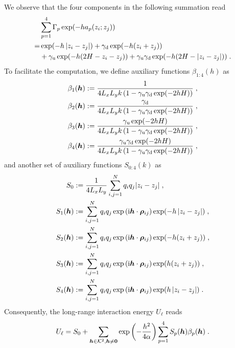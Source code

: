 We observe that the four components in the following summation read
\begin{align*}
     &\sum_{p=1}^4\Gamma_p\exp(-ha_p(z_i;z_j))\\  
     =&\exp(- h \left\lvert z_i-z_j\right\rvert)+\gamma_{\mathrm{d}}\exp(-h(z_i+z_j))\\
     &+\gamma_{\mathrm{u}}\exp(-h(2H-z_i-z_j)) +\gamma_{\mathrm{u}}\gamma_{\mathrm{d}}\exp(-h(2H-\left\lvert z_i-z_j\right\rvert))\;.
\end{align*}
To facilitate the computation, we define auxiliary functions $\beta_{1:4}(h)$ as 
\begin{align*}
    \beta_1(\boldsymbol{h})&:= \frac{1}{4  L_xL_yk\left(1-\gamma_{\mathrm{u}}\gamma_{\mathrm{d}}\exp(-2hH)\right)} \;,\\
    \beta_2(\boldsymbol{h})&:= \frac{\gamma_{\mathrm{d}}}{4  L_xL_yk\left(1-\gamma_{\mathrm{u}}\gamma_{\mathrm{d}}\exp(-2hH)\right)} \;,\\
    \beta_3(\boldsymbol{h})&:= \frac{\gamma_{\mathrm{u}}\exp(-2hH)}{4  L_xL_yk\left(1-\gamma_{\mathrm{u}}\gamma_{\mathrm{d}}\exp(-2hH)\right)}\;,\\
    \beta_4(\boldsymbol{h})&:= \frac{\gamma_{\mathrm{u}}\gamma_{\mathrm{d}}\exp(-2hH)}{4  L_xL_yk\left(1-\gamma_{\mathrm{u}}\gamma_{\mathrm{d}}\exp(-2hH)\right)}\;,
\end{align*}
and another set of auxiliary functions   $S_{0:4}(k)$ as
\begin{align*} 
    S_0&:=\frac{1}{4  L_xL_y}\sum_{i,j=1}^Nq_iq_j {\left\lvert z_i-z_j\right\rvert}\;,\\
    S_1(\boldsymbol{h})&:=\sum_{i,j=1}^Nq_iq_j  \exp{(\mathrm{i} \boldsymbol{h} \cdot \boldsymbol{\rho}_{ij})}\exp(-h\left\lvert z_i-z_j\right\rvert)\;,\\
    S_2(\boldsymbol{h})&:=\sum_{i,j=1}^Nq_iq_j  \exp{(\mathrm{i} \boldsymbol{h} \cdot \boldsymbol{\rho}_{ij})}\exp(-h(z_i+z_j))\;,\\
    S_3(\boldsymbol{h})&:=\sum_{i,j=1}^Nq_iq_j  \exp{(\mathrm{i} \boldsymbol{h} \cdot \boldsymbol{\rho}_{ij})}\exp(h(z_i+z_j))\;,\\
    S_4(\boldsymbol{h})&:=\sum_{i,j=1}^Nq_iq_j \exp{(\mathrm{i} \boldsymbol{h} \cdot \boldsymbol{\rho}_{ij})}\exp(h\left\lvert z_i-z_j\right\rvert)\;.
\end{align*}
Consequently, the long-range interaction energy   $U_\ell$ reads
\begin{equation}\label{eq...text...Energy}
    U_\ell = S_0+ \sum_{\boldsymbol{h}\in\mathcal{K}^2,\boldsymbol{h}\neq\bm{0}} \exp\left(-\frac{h^2}{4\alpha}\right)\sum_{p=1}^4S_p(\boldsymbol{h}) \beta_p(\boldsymbol{h})\;.
\end{equation}
